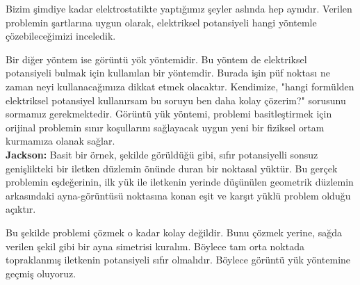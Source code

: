 \begin{theorem}
Bizim şimdiye kadar elektrostatikte yaptığımız şeyler aslında hep aynıdır. Verilen problemin şartlarına uygun olarak, elektriksel potansiyeli hangi yöntemle çözebileceğimizi inceledik.

Bir diğer yöntem ise görüntü yök yöntemidir. Bu yöntem de elektriksel potansiyeli bulmak için kullanılan bir yöntemdir. Burada işin püf noktası ne zaman neyi kullanacağımıza dikkat etmek olacaktır. Kendimize, "hangi formülden elektriksel potansiyel kullanırsam bu soruyu ben daha kolay çözerim?" sorusunu sormamız gerekmektedir. Görüntü yük yöntemi, problemi basitleştirmek için orijinal problemin sınır koşullarını sağlayacak uygun yeni bir fiziksel ortam kurmamıza olanak sağlar.\\
\textbf{Jackson:} Basit bir örnek, şekilde görüldüğü gibi, sıfır potansiyelli sonsuz genişlikteki bir iletken düzlemin önünde duran bir noktasal yüktür. Bu gerçek problemin eşdeğerinin, ilk yük ile iletkenin yerinde düşünülen geometrik düzlemin arkasındaki ayna-görüntüsü noktasına konan eşit ve karşıt yüklü problem olduğu açıktır.

Bu şekilde problemi çözmek o kadar kolay değildir. Bunu çözmek yerine, sağda verilen şekil gibi bir ayna simetrisi kuralım. Böylece tam orta noktada topraklanmış iletkenin potansiyeli sıfır olmalıdır. Böylece görüntü yük yöntemine geçmiş oluyoruz.

\begin{center}

\begin{tikzpicture}[x=0.75pt,y=0.75pt,yscale=-1,xscale=1]


\end{tikzpicture}
\end{center}
\end{theorem}
